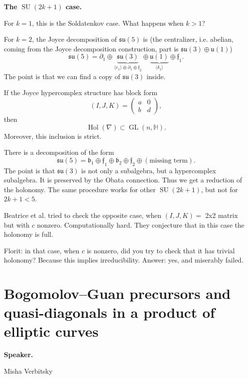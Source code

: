 \medskip\noindent
{\bf The $\operatorname{SU}(2k+1)$
case.}

For $k=1$, this is the Soldatenkov
case.
What happens when $k>1$?

For $k=2$, the Joyce decomposition of
$\mathfrak{su}(5)$ is
(the centralizer,
i.e. abelian, coming from
the Joyce decomposition construction, 
part is $\mathfrak{su}(3)
\oplus \mathfrak{u}(1)$)
\[
\mathfrak{su}(5)
=
\partial_1
\oplus
\underbrace{\mathfrak{su}(3)}_{
\langle e_1\rangle
\oplus\partial_1\oplus\mathfrak f_2}
\oplus
\underbrace{\mathfrak u(1)}_{
\langle\delta_1\rangle}
\oplus
\mathfrak f_1.
\]
The point is that we can find a copy
of $\mathfrak{su}(3)$ inside.

\begin{theorem}[BFGV]
\label{theorem-joyce-hypercomplex2}
If the Joyce hypercomplex structure
has block form
\[
(I,J,K)=
\begin{pmatrix}
a & 0\\
b & d
\end{pmatrix},
\]
then
\[
\operatorname{Hol}(\nabla)
\subset
\operatorname{GL}(n,\mathbb{H}).
\]
Moreover, this inclusion is strict.
\end{theorem}

There is a decomposition of the form
\[
\mathfrak{su}(5)
=
\mathfrak b_1\oplus\mathfrak f_1
\oplus\mathfrak b_2\oplus
\mathfrak f_2
\oplus(\text{missing term}).
\]
The point is that $\mathfrak{su}(3)$
is not only a subalgebra, but a
hypercomplex subalgebra.
It is preserved by the Obata
connection.
Thus we get a reduction of the
holonomy.
The same procedure works for other
$\operatorname{SU}(2k+1)$, but not
for $2k+1<5$.

Beatrice et al. tried to check the opposite
case, when $(I,J,K) = $ 2x2 matrix
but with $c$ nonzero. Computationally hard.
They conjecture that in this case
the holonomy is full.

Florit: in that case, when $c$ is nonzero,
did you try to check that it has trivial
holonomy? Because this implies
irreducibility. Answer: yes, and miserably
failed.

\section{Bogomolov--Guan precursors
and quasi-diagonals in a product of
elliptic curves}
\label{section-bogomolov-guan-
quasi-diagonals}

\medskip\noindent
{\bf Speaker.}

Misha Verbitsky

